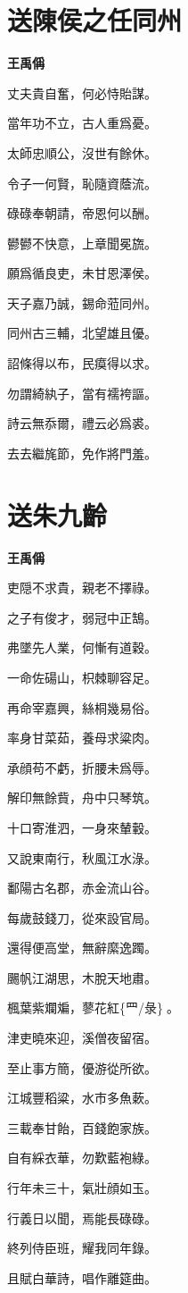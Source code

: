 \documentclass[12pt,a4paper]{ctexbook}
\begin{document}
\section{送陳侯之任同州}
\textbf{王禹偁}\par\vspace{0.5em}
丈夫貴自奮，何必恃貽謀。\par
當年功不立，古人重爲憂。\par
太師忠順公，沒世有餘休。\par
令子一何賢，恥隨資蔭流。\par
碌碌奉朝請，帝恩何以酬。\par
鬰鬰不快意，上章聞冕旒。\par
願爲循良吏，未甘恩澤侯。\par
天子嘉乃誠，錫命蒞同州。\par
同州古三輔，北望雄且優。\par
詔條得以布，民瘼得以求。\par
勿謂綺紈子，當有襦袴謳。\par
詩云無忝爾，禮云必爲裘。\par
去去繼旄節，免作將門羞。\par

\section{送朱九齡}
\textbf{王禹偁}\par\vspace{0.5em}
吏隠不求貴，親老不擇祿。\par
之子有俊才，弱冠中正鵠。\par
弗墜先人業，何慚有道穀。\par
一命佐碭山，枳棘聊容足。\par
再命宰嘉興，絲桐幾易俗。\par
率身甘菜茹，養母求粱肉。\par
承顔苟不虧，折腰未爲辱。\par
解印無餘貲，舟中只琴筑。\par
十口寄淮泗，一身來輦轂。\par
又說東南行，秋風江水淥。\par
鄱陽古名郡，赤金流山谷。\par
每歲鼓錢刀，從來設官局。\par
還得便高堂，無辭縻逸躅。\par
颺帆江湖思，木脫天地肅。\par
楓葉紫斕斒，蓼花紅\{罒/彔\}𦌊。\par
津吏曉來迎，溪僧夜留宿。\par
至止事方簡，優游從所欲。\par
江城豐稻粱，水市多魚蔌。\par
三載奉甘飴，百錢飽家族。\par
自有綵衣華，勿歎藍袍綠。\par
行年未三十，氣壯顔如玉。\par
行義日以聞，焉能長碌碌。\par
終列侍臣班，耀我同年錄。\par
且賦白華詩，唱作離筵曲。\par
\end{document}
